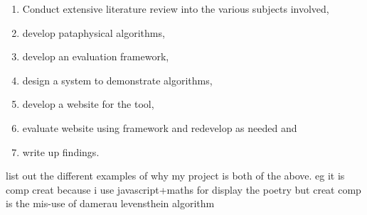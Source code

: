 \documentclass[11pt]{thesis} %
\begin{document}
\begin{enumerate}
  \item Conduct extensive literature review into the various subjects involved,
  \item develop pataphysical algorithms,
  \item develop an evaluation framework,
  \item design a system to demonstrate algorithms,
  \item develop a website for the tool,
  \item evaluate website using framework and redevelop as needed and
  \item write up findings.
\end{enumerate}


\begin{draft}
  list out the different examples of why my project is both of the above. 
  eg it is comp creat because i use javascript+maths for display the poetry
  but creat comp is the mis-use of damerau levensthein algorithm
\end{draft}
\end{document}
